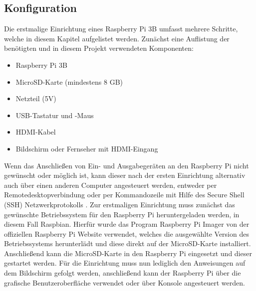 \documentclass[conference]{IEEEtran}
\begin{document}
\subsection{Konfiguration}
Die erstmalige Einrichtung eines Raspberry Pi 3B umfasst mehrere Schritte, welche in diesem Kapitel aufgelistet werden. Zunächst eine Auflistung der benötigten und in diesem Projekt verwendeten Komponenten:
\begin{itemize}
	\item Raspberry Pi 3B
	\item MicroSD-Karte (mindestens 8 GB)
	\item Netzteil (5V)
	\item USB-Tastatur und -Maus
	\item HDMI-Kabel
	\item Bildschirm oder Fernseher mit HDMI-Eingang
\end{itemize}
Wenn das Anschließen von Ein- und Ausgabegeräten an den Raspberry Pi nicht gewünscht oder möglich ist, kann dieser nach der ersten Einrichtung alternativ auch über einen anderen Computer angesteuert werden, entweder per Remotedesktopverbindung oder per Kommandozeile mit Hilfe des Secure Shell (SSH) Netzwerkprotokolls \cite{raspy}. Zur erstmaligen Einrichtung muss zunächst das gewünschte Betriebssystem für den Raspberry Pi heruntergeladen werden, in diesem Fall Raspbian. Hierfür wurde das Program Raspberry Pi Imager von der offiziellen Raspberry Pi Website verwendet, welches die ausgewählte Version des Betriebssystems herunterlädt und diese direkt auf der MicroSD-Karte installiert. Anschließend kann die MicroSD-Karte in den Raspberry Pi eingesetzt und dieser gestartet werden. Für die Einrichtung muss nun lediglich den Anweisungen auf dem Bildschirm gefolgt werden, anschließend kann der Raspberry Pi über die grafische Benutzeroberfläche verwendet oder über Konsole angesteuert werden.  
\end{document}
